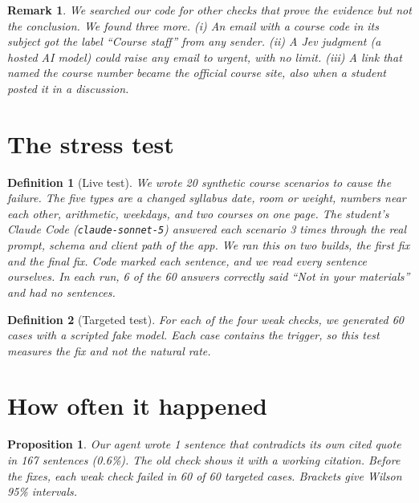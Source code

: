 \documentclass[10pt]{article}
\theoremstyle{card}
\newtheorem{definition}{Definition}
\newtheorem{proposition}{Proposition}
\newtheorem*{remark}{Remark}
\begin{document}
\begin{remark}
We searched our code for other checks that prove the evidence but not the conclusion. We found three more.
(i) An email with a course code in its subject got the label ``Course staff'' from any sender.
(ii) A Jev judgment (a hosted AI model) could raise any email to urgent, with no limit.
(iii) A link that named the course number became the official course site, also when a student posted it in a discussion.
\end{remark}

\section{The stress test}

\begin{definition}[Live test]
We wrote 20 synthetic course scenarios to cause the failure. The five types are a changed syllabus date, room or weight, numbers near each other, arithmetic, weekdays, and two courses on one page. The student's Claude Code (\texttt{claude-sonnet-5}) answered each scenario 3 times through the real prompt, schema and client path of the app. We ran this on two builds, the first fix and the final fix. Code marked each sentence, and we read every sentence ourselves. In each run, 6 of the 60 answers correctly said ``Not in your materials'' and had no sentences.
\end{definition}

\begin{definition}[Targeted test]
For each of the four weak checks, we generated 60 cases with a scripted fake model. Each case contains the trigger, so this test measures the fix and not the natural rate.
\end{definition}

\section{How often it happened}

\begin{proposition}
Our agent wrote 1 sentence that contradicts its own cited quote in 167 sentences (0.6\%). The old check shows it with a working citation. Before the fixes, each weak check failed in 60 of 60 targeted cases. Brackets give Wilson 95\% intervals.
\end{proposition}
\end{document}

